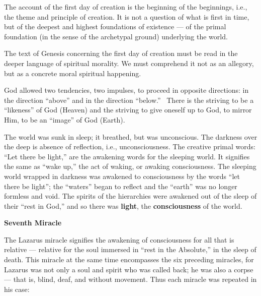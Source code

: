 The account of the first day of creation is the beginning of the beginnings, i.e., the theme and principle of creation. It is not a question of what is first in time, but of the deepest and highest foundations of existence — of the primal foundation (in the sense of the archetypal ground) underlying the world.

The text of Genesis concerning the first day of creation must be read in the deeper language of spiritual morality. We must comprehend it not as an allegory, but as a concrete moral spiritual happening.

God allowed two tendencies, two impulses, to proceed in opposite directions: in the direction ``above'' and in the direction ``below.''  There is the striving to be a ``likeness'' of God (Heaven) and the striving to give oneself up to God, to mirror Him, to be an ``image'' of God (Earth).

The world was sunk in sleep; it breathed, but was unconscious. The darkness over the deep is absence of reflection, i.e., unconsciousness. The creative primal words: ``Let there be light,'' are the awakening words for the sleeping world. It signifies the same as ``wake up,'' the act of waking, or awaking consciousness. The sleeping world wrapped in darkness was awakened to consciousness by the words ``let there be light''; the ``waters'' began to reflect and the ``earth'' was no longer formless and void. The spirits of the hierarchies were awakened out of the sleep of their ``rest in God,'' and so there was \textbf{light}, the \textbf{consciousness} of the world.

\textbf{Seventh Miracle}

The Lazarus miracle signifies the awakening of consciousness for all that is relative — relative for the soul immersed in ``rest in the Absolute,'' in the sleep of death. This miracle at the same time encompasses the six preceding miracles, for Lazarus was not only a soul and spirit who was called back; he was also a corpse — that is, blind, deaf, and without movement. Thus each miracle was repeated in his case:


